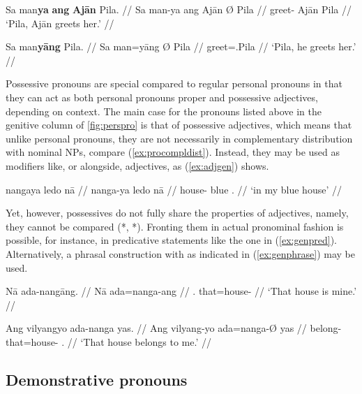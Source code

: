\pex
\a\begingl
	\gla Sa man\textbf{ya} \textbf{ang} \textbf{Ajān} {} Pila. //
	\glb Sa man-ya ang ​Ajān Ø ​Pila //
	\glc \PatT{} greet-\TsgM{} \Aarg{} ​Ajān \Top{} ​Pila //
	\glft `Pila, Ajān greets her.' //
\endgl

\a\begingl
	\gla Sa man\textbf{yāng} {} Pila. //
	\glb Sa man=yāng Ø ​Pila //
	\glc \PatT{} greet=\TsgM{}.\Aarg{} \Top{} ​Pila //
	\glft `Pila, he greets her.' //
\endgl
\xe



Possessive pronouns are special compared to regular personal pronouns in that 
they can act as both personal pronouns proper and possessive adjectives, 
depending on context. The main case for the pronouns listed above in the 
genitive column of \autoref{fig:perspro} is that of possessive adjectives, 
which means that unlike personal pronouns, they are not necessarily in 
complementary distribution with nominal NPs, compare (\ref{ex:procompldist}). 
Instead, they may be used as modifiers like, or alongside, adjectives, as 
(\ref{ex:adjgen}) shows.

\ex\label{ex:adjgen}
\begingl
	\gla nangaya ledo nā //
	\glb nanga-ya ledo nā //
	\glc house-\Loc{} blue \Fsg{}.\Gen{} //
	\glft `in my blue house' //
\endgl
\xe

Yet, however, possessives do not fully share the properties of adjectives, 
namely, they cannot be compared (*, 
*). Fronting them in actual pronominal fashion is 
possible, for instance, in predicative statements like the one in 
(\ref{ex:genpred}). Alternatively, a phrasal construction with 
 as indicated in (\ref{ex:genphrase}) may be 
used.

\pex
\a\label{ex:genpred}\begingl
	\gla Nā ada-nangāng. //
	\glb Nā ada=nanga-ang //
	\glc \Fsg{}.\Gen{} that=house-\Aarg{} //
	\glft `That house is mine.' //
\endgl

\a\label{ex:genphrase}\begingl
	\gla Ang vilyangyo ada-nanga yas. //
	\glb Ang vilyang-yo ada=nanga-Ø yas //
	\glc \AgtT{} belong-\TsgN{} that=house-\Top{} \Fsg{}.\Parg{} //
	\glft `That house belongs to me.' //
\endgl
\xe


\subsection{Demonstrative pronouns}
\label{subsec:dempro}

